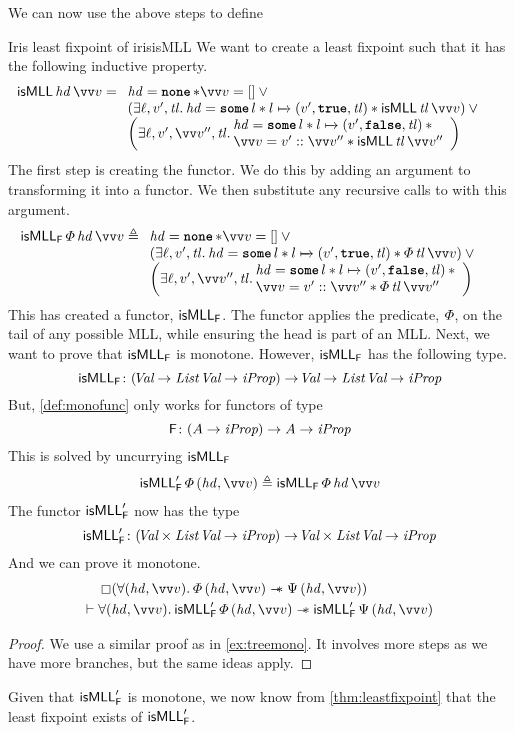 \documentclass[thesis.tex]{subfiles}
\begin{document}
We can now use the above steps to define \isMLL
\begin{example}{Iris least fixpoint of \isMLL}{irisisMLL}
    We want to create a least fixpoint such that it has the following inductive property.
    \begin{align*}
        \isMLL\, \hd\, \vect{\val} & = \isMLLRecDef
    \end{align*}
    The first step is creating the functor. We do this by adding an argument to \isMLL transforming it into a functor. We then substitute any recursive calls to \isMLL with this argument.
    \begin{align*}
        \isMLL_\hopred\, \pred\, \hd\, \vect{v} & \eqdef
        \isMLLFDef
    \end{align*}
    This has created a functor, $\textsf{\upshape isMLL}_{\textsf{\upshape F}}$. The functor applies the predicate, $\varPhi$, on the tail of any possible MLL, while ensuring the head is part of an MLL. Next, we want to prove that $\textsf{\upshape isMLL}_{\textsf{\upshape F}}$ is monotone. However, $\textsf{\upshape isMLL}_{\textsf{\upshape F}}$ has the following type.
    \[\textsf{\upshape isMLL}_{\textsf{\upshape F}}\colon (\kern-0.2em\textit{Val} \to \textit{List}\ \kern-0.2em\textit{Val} \to \textit{iProp}) \to \kern-0.2em\textit{Val} \to \textit{List}\ \kern-0.2em\textit{Val} \to \textit{iProp}\]
    But, \cref*{def:monofunc} only works for functors of type
    \[\textsf{\upshape F}\colon (A \to \textit{iProp}) \to A \to \textit{iProp}\]
    This is solved by uncurrying $\textsf{\upshape isMLL}_{\textsf{\upshape F}}$
    \begin{align*}
        \isMLL'_\hopred\, \pred\, (\hd, \vect{\val}) \eqdef \isMLL_\hopred\, \pred\, \hd\, \vect{\val}
    \end{align*}
    The functor $\textsf{\upshape isMLL}'_{\textsf{\upshape F}}$ now has the type
    \[\textsf{\upshape isMLL}'_{\textsf{\upshape F}}\colon (\kern-0.2em\textit{Val} \times \textit{List}\ \kern-0.2em\textit{Val} \to \textit{iProp}) \to  \kern-0.2em\textit{Val} \times \textit{List}\ \kern-0.2em\textit{Val} \to \textit{iProp}\]
    And we can prove it monotone.
    \begin{align*}
                  & \always(\All(\hd, \vect{\val}). \pred\,(\hd, \vect{\val}) \wand \predB\,(\hd, \vect{\val}))                              \\
        \proves{} & \All(\hd, \vect{\val}). \isMLL'_\hopred\, \pred\, (\hd, \vect{\val}) \wand \isMLL'_\hopred\, \predB\, (\hd, \vect{\val})
    \end{align*}
    \begin{proof}
        We use a similar proof as in \cref*{ex:treemono}. It involves more steps as we have more branches, but the same ideas apply.
    \end{proof}
    Given that $\textsf{\upshape isMLL}'_{\textsf{\upshape F}}$ is monotone, we now know from \cref*{thm:leastfixpoint} that the least fixpoint exists of $\textsf{\upshape isMLL}'_{\textsf{\upshape F}}$.
    \begin{align*}

\end{align*}
\end{example}
\end{document}
